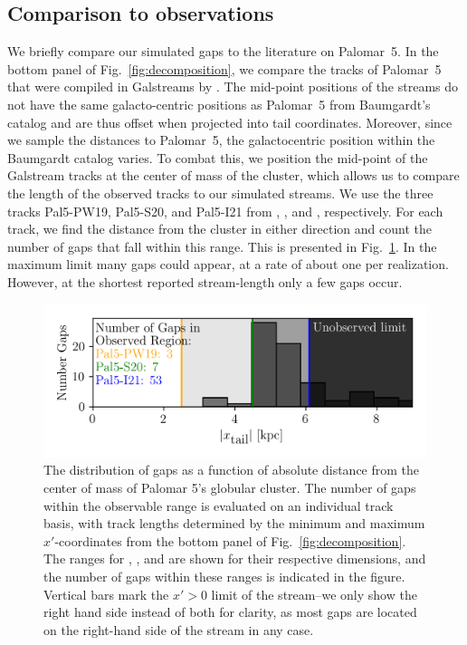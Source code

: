 \documentclass[draft]{aa}
\begin{document}
  \subsection{Comparison to observations}

    We briefly compare our simulated gaps to the literature on Palomar~5. In the bottom panel of Fig.~\ref{fig:decomposition}, we compare the tracks of Palomar~5 that were compiled in Galstreams by \citet{2023MNRAS.520.5225M}. The mid-point positions of the streams do not have the same galacto-centric positions as Palomar~5 from Baumgardt's catalog and are thus offset when projected into tail coordinates. Moreover, since we sample the distances to Palomar~5, the galactocentric position within the Baumgardt catalog varies. To combat this, we position the mid-point of the Galstream tracks at the center of mass of the cluster, which allows us to compare the length of the observed tracks to our simulated streams. We use the three tracks Pal5-PW19, Pal5-S20, and Pal5-I21 from \citet{2019AJ....158..223P}, \citet{2020MNRAS.495.2222S}, and \citet{2021ApJ...914..123I}, respectively. For each track, we find the distance from the cluster in either direction and count the number of gaps that fall within this range. This is presented in Fig.~\ref{fig:GapsWithinSight}. In the maximum limit many gaps could appear, at a rate of about one per realization. However, at the shortest reported stream-length only a few gaps occur.
      \begin{figure}
        \centering
        \includegraphics[width=\linewidth]{GapWithinSight.png}
        \caption{The distribution of gaps as a function of absolute distance from the center of mass of Palomar 5's globular cluster. The number of gaps within the observable range is evaluated on an individual track basis, with track lengths determined by the minimum and maximum $x'$-coordinates from the bottom panel of Fig.~\ref{fig:decomposition}. The ranges for \citet{2019AJ....158..223P}, \citet{2020MNRAS.495.2222S}, and \citet{2021ApJ...914..123I} are shown for their respective dimensions, and the number of gaps within these ranges is indicated in the figure. Vertical bars mark the $x' > 0$ limit of the stream--we only show the right hand side instead of both for clarity, as most gaps are located on the right-hand side of the stream in any case. }
        \label{fig:GapsWithinSight}
      \end{figure}    
    
\end{document}
